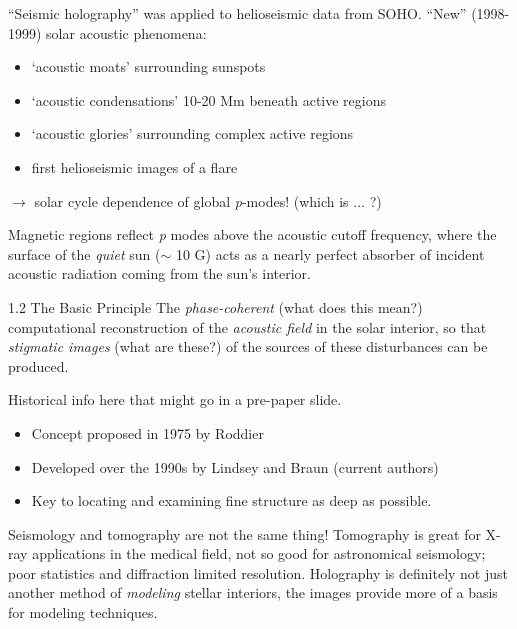 \documentclass{beamer}
\begin{document}
\begin{frame}{1.1}
    ``Seismic holography'' was applied to helioseismic data from SOHO\@.
    ``New'' (1998-1999) solar acoustic phenomena:
    \begin{itemize}
        \item `acoustic moats' surrounding sunspots
        \item `acoustic condensations' 10-20 Mm beneath active regions
        \item `acoustic glories' surrounding complex active regions
        \item first helioseismic images of a flare
    \end{itemize}
    $\rightarrow$ solar cycle dependence of global \emph{p}-modes!
    (which is $\ldots$ ?)

    Magnetic regions reflect \emph{p} modes above the acoustic cutoff
    frequency, where the surface of the \emph{quiet} sun ($\sim$ 10 G)
    acts as a nearly perfect absorber of incident acoustic radiation
    coming from the sun's interior.
\end{frame}

\begin{frame}{1.2 \- The Basic Principle}
    The \emph{phase-coherent} (what does this mean?) computational
    reconstruction of the \emph{acoustic field} in the solar interior,
    so that \emph{stigmatic images} (what are these?) of the sources
    of these disturbances can be produced.

    Historical info here that might go in a pre-paper slide.
\end{frame}

\begin{frame}{1.3}
    \begin{itemize}
        \item Concept proposed in 1975 by Roddier
        \item Developed over the 1990s by Lindsey and Braun
            (current authors)
        \item Key to locating and examining fine structure as deep as
            possible.
    \end{itemize}
\end{frame}

\begin{frame}{1.4}
Seismology and tomography are not the same thing! Tomography is great
for X-ray applications in the medical field, not so good for
astronomical seismology; poor statistics and diffraction limited resolution.
Holography is definitely not just another method of \emph{modeling}
stellar interiors, the images provide more of a basis for modeling
techniques.
\end{frame}
\end{document}
